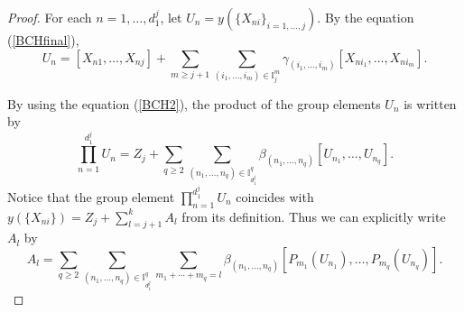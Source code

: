 \documentclass[10pt,a4paper]{amsart}
\numberwithin{equation}{section}
\begin{document}
\begin{proof}
For each $n=1,\dots,d_1^j$,
let $U_n=y(\{X_{ni}\}_{i=1,\dots,j})$.
By the equation (\ref{BCHfinal}),
 \begin{equation}\label{equn}
 U_n=[X_{n1},\dots,X_{nj}]+\sum_{m\geq j+1}\sum_{(i_1,\dots,i_m)\in\mathbb{I}_j^m}\gamma_{(i_1,\dots,i_m)}[X_{ni_1},\dots,X_{ni_m}].
 \end{equation}

By using the equation (\ref{BCH2}),
the product of the group elements $U_n$ is written by
\[
 \prod_{n=1}^{d_1^j}U_n=Z_j+\sum_{q\geq2}\sum_{(n_1,\dots,n_q)\in \mathbb{I}_{d_1^j}^q}\beta_{(n_1,\dots,n_q)}[U_{n_1},\dots,U_{n_q}].
\]
Notice that the group element $\prod_{n=1}^{d_1^j}U_n$ coincides with $y(\{X_{ni}\})=Z_j+\sum_{l=j+1}^{k}A_l$ from its definition.
Thus we can explicitly write $A_l$ by
\[
A_l=\sum_{q\geq 2}\sum_{(n_1,\dots,n_q)\in\mathbb{I}_{d_1^j}^q}\sum_{m_1+\cdots +m_q=l}\beta_{(n_1,\dots,n_q)}[P_{m_1}(U_{n_1}),\dots,P_{m_q}(U_{n_q})].
\]


\end{proof}
\end{document}
